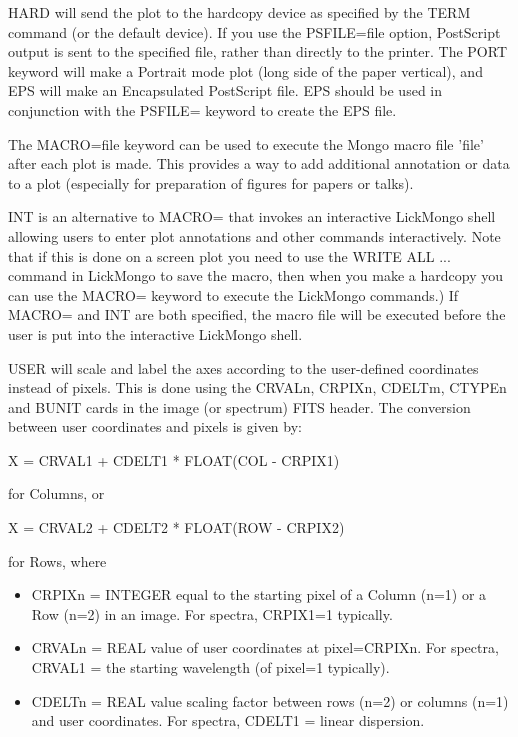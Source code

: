 HARD will send the plot to the hardcopy device as specified by the TERM
command (or the default device). If you use the PSFILE=file option,
PostScript output is sent to the specified file, rather than directly to
the printer.  The PORT keyword will make a Portrait mode plot (long side of
the paper vertical), and EPS will make an Encapsulated PostScript file.
EPS should be used in conjunction with the PSFILE= keyword to create the
EPS file.

The MACRO=file keyword can be used to execute the Mongo macro file 'file'
after each plot is made.  This provides a way to add additional annotation
or data to a plot (especially for preparation of figures for papers or
talks).

INT is an alternative to MACRO= that invokes an interactive LickMongo shell
allowing users to enter plot annotations and other commands interactively.
Note that if this is done on a screen plot you need to use the WRITE ALL
... command in LickMongo to save the macro, then when you make a hardcopy
you can use the MACRO= keyword to execute the LickMongo commands.)  If
MACRO= and INT are both specified, the macro file will be executed before
the user is put into the interactive LickMongo shell.

USER will scale and label the axes according to the user-defined
coordinates instead of pixels.  This is done using the CRVALn, CRPIXn,
CDELTm, CTYPEn and BUNIT cards in the image (or spectrum) FITS header.  The
conversion between user coordinates and pixels is given by:
\begin{hanging}
  \item{X = CRVAL1 + CDELT1 * FLOAT(COL - CRPIX1)}
\end{hanging}
for Columns, or
\begin{hanging}
  \item{X = CRVAL2 + CDELT2 * FLOAT(ROW - CRPIX2)}
\end{hanging}
for Rows, where
\begin{itemize}
  \item[]{CRPIXn = INTEGER equal to the starting pixel of a Column (n=1)
         or a Row (n=2) in an image.  For spectra, CRPIX1=1 typically.}
  \item[]{CRVALn = REAL value of user coordinates at pixel=CRPIXn.  For
         spectra, CRVAL1 = the starting wavelength (of pixel=1 typically).}
  \item[]{CDELTn = REAL value scaling factor between rows (n=2) or columns
         (n=1) and user coordinates.  For spectra, CDELT1 = linear dispersion.}
\end{itemize}

